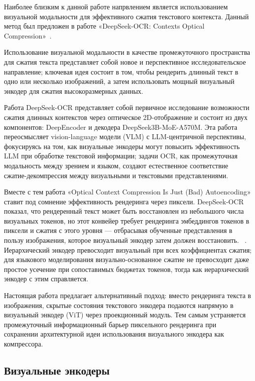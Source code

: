 \documentclass[a4paper,12pt]{extarticle}
\begin{document}
Наиболее близким к данной работе напрвлением является использованием визуальной модальности для эффективного сжатия текстового контекста. Данный метод был предложен в работе «DeepSeek-OCR: Contexts Optical Compression»~\cite{deepseek_ocr}.

Использование визуальной модальности в качестве промежуточного пространства для сжатия текста представляет собой новое и перспективное исследовательское направление; ключевая идея состоит в том, чтобы рендерить длинный текст в одно или несколько изображений, а затем использовать мощный визуальный энкодер для сжатия высокоразмерных данных.

Работа DeepSeek-OCR представляет собой первичное исследование возможности сжатия длинных контекстов через оптическое 2D-отображение и состоит из двух компонентов: DeepEncoder и декодера DeepSeek3B-MoE-A570M. Эта работа переосмысляет vision-language модели (VLM) с LLM-центричной перспективы, фокусируясь на том, как визуальные энкодеры могут повысить эффективность LLM при обработке текстовой информации; задачи OCR, как промежуточная модальность между зрением и языком, создают естественное соответствие сжатие-декомпрессия между визуальными и текстовыми представлениями.

Вместе с тем работа «Optical Context Compression Is Just (Bad) Autoencoding» ставит под сомнение эффективность рендеринга через пиксели. DeepSeek-OCR показал, что рендеренный текст может быть восстановлен из небольшого числа визуальных токенов, но этот конвейер требует рендеринга эмбеддингов токенов в пиксели и сжатия с этого уровня — отбрасывая обученные представления в пользу изображения, которое визуальный энкодер затем должен восстановить. ~\cite{bad_ocr}. Иерархический энкодер превосходит визуальный при всех коэффициентах сжатия; для языкового моделирования визуально-основанное сжатие не превосходит даже простое усечение при сопоставимых бюджетах токенов, тогда как иерархический энкодер с этим справляется.

Настоящая работа предлагает альтернативный подход: вместо рендеринга текста в изображения, скрытые состояния текстового энкодера подаются напрямую в визуальный энкодер (ViT) через проекционный модуль. Тем самым устраняется промежуточный информационный барьер пиксельного рендеринга при сохранении архитектурной идеи использования визуального энкодера как компрессора.


\subsection{Визуальные энкодеры}
\end{document}
